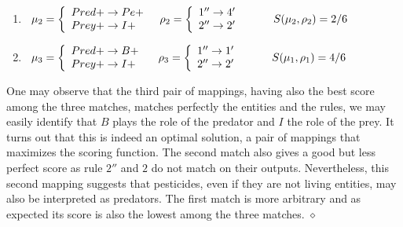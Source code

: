 \documentclass[a4paper,twoside]{article}
\begin{document}
\begin{example}
\begin{enumerate}
\item $\begin{array}{l@{\hspace{3mm}}l@{\hspace{3mm}}l}
	\mapcomp_2=\left\{
				\begin{array}{l}
					Pred+ \to Pe+ \\
                    Prey+ \to I+ \\
				\end{array}\right.
                    &
     \maprule_2=\left\{
                \begin{array}{l}
                    1'' \to 4' \\
					2'' \to 2' \\
					\end{array}\right.
                &
   \qquad             \gf(\mapcomp_2,\maprule_2)=2/6
\end{array}$
                
\item $\begin{array}{l@{\hspace{3mm}}l@{\hspace{3mm}}l}
	\mapcomp_3=\left\{
		\begin{array}{l}
					Pred+ \to B+ \\
                    Prey+ \to I+ \\
				\end{array}\right.
                    &
     ~\maprule_3=\left\{
                \begin{array}{l}
                   1'' \to 1' \\
				   2'' \to 2' \\
					\end{array}\right. 
                    &
   \qquad                 \gf(\mapcomp_1,\maprule_1)=4/6
\end{array}$
%

\end{enumerate}

One may observe that the third pair of mappings, having also the best score among the three matches, matches perfectly the entities and the rules, \ie we may easily identify that $B$ plays the role of the predator and $I$ the role of the prey.
It turns out that this is indeed an optimal solution, \ie a pair of mappings that maximizes the scoring function.
%
The second match also gives a good but less perfect score as
rule $2''$ and $2$ do not match on their outputs. Nevertheless, this second mapping suggests that pesticides, even if they are not living entities, may also be interpreted as predators. 
%
%
The first match is more arbitrary and as expected its score is also the lowest among the three matches.
\hfill $\diamond$
\end{example}
\end{document}
